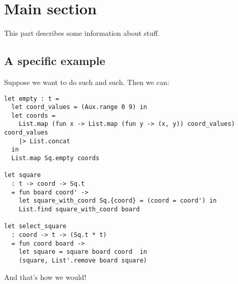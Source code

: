 \documentclass[11pt]{article}
\author{Shon Feder}
\date{\today}
\title{}
\begin{document}
\tableofcontents

\section{Main section}
\label{sec:orgheadline2}

This part describes some information about stuff.

\subsection{A specific example}
\label{sec:orgheadline1}

Suppose we want to do such and such. Then we can:

\begin{verbatim}
let empty : t =
  let coord_values = (Aux.range 0 9) in
  let coords =
    List.map (fun x -> List.map (fun y -> (x, y)) coord_values) coord_values
    |> List.concat
  in
  List.map Sq.empty coords

let square
  : t -> coord -> Sq.t
  = fun board coord' ->
    let square_with_coord Sq.{coord} = (coord = coord') in
    List.find square_with_coord board

let select_square
  : coord -> t -> (Sq.t * t)
  = fun coord board ->
    let square = square board coord  in
    (square, List'.remove board square)
\end{verbatim}

And that's how we would!
\end{document}
